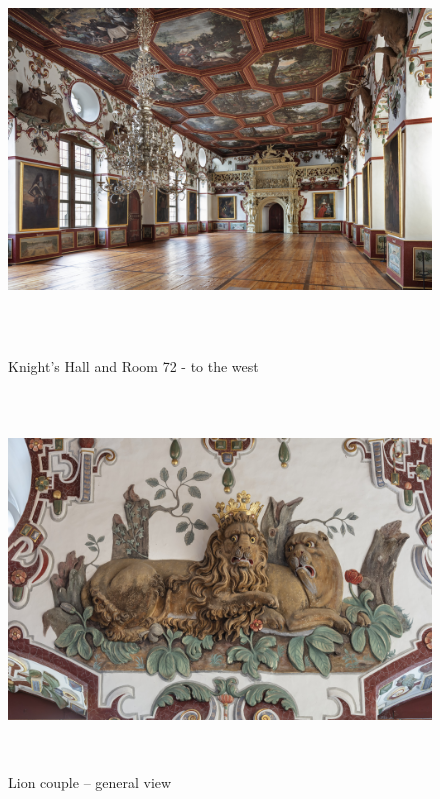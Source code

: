 \documentclass[
  a4paper,
]{book}
\begin{document}
\begin{figure}

\centering

\includegraphics[height=10cm]{images/fmd10005862a.jpg}

\caption{Knight's Hall and Room 72 - to the west}
\label{fig:{images/fmd10005862a.jpg}}

\clearpage

\centering

\includegraphics[height=10cm]{images/fmd10005864a.jpg}

\caption{Lion couple – general view}
\label{fig:{images/fmd10005864a.jpg}}

\clearpage


\end{figure}
\end{document}
